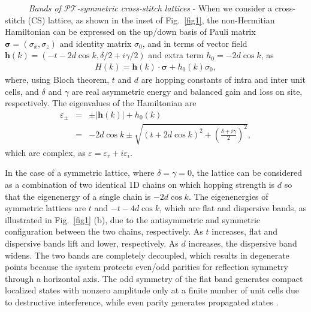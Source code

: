\documentclass[report,epsfig,pre]{revtex4}
\begin{document}
~~~~~ {\it Bands of $\mathcal{PT}$-symmetric cross-stitch lattices} - 
When we consider a cross-stitch (CS) lattice, as shown in the inset of Fig.~\ref{fig1}, the non-Hermitian Hamiltonian can be expressed on the up/down basis of Pauli matrix $\pmb{\sigma}=(\sigma_x,\sigma_z)$ and identity matrix $\sigma_0$, and in terms of vector field $\pmb{h}(k)=(-t-2d\cos{k},\delta/2+i\gamma/2)$ and extra term $h_0=-2d\cos{k}$, as
\begin{eqnarray}
H(k)=\pmb{h}(k)\cdot\pmb{\sigma}+h_0(k)\sigma_0,
\end{eqnarray}
where, using Bloch theorem, $t$ and $d$ are hopping constants of intra and inter unit cells, and $\delta$ and $\gamma$ are real asymmetric energy and balanced gain and loss on site, respectively. The eigenvalues of the Hamiltonian are
\begin{eqnarray}
\nonumber
\varepsilon_{\pm} & = & \pm|\pmb{h}(k)|+h_0(k) \\
& = & -2d \cos{k} \pm \sqrt{(t+2d \cos{k})^2 + \left(\frac{\delta+ i \gamma}{2}\right)^2},
\label{energy}
\end{eqnarray}
which are complex, as $\varepsilon = \varepsilon_r + i \varepsilon_i$.




In the case of a symmetric lattice, where $\delta=\gamma=0$, the lattice can be considered as a combination of two identical 1D chains on which hopping strength is $d$ so that the eigenenergy of a single chain is $-2d \cos{k}$. 
The eigenenergies of symmetric lattices are $t$ and $-t - 4d \cos{k}$, which are flat and dispersive bands, as illustrated in Fig.~\ref{fig1} (b), due to the antisymmetric and symmetric configuration between the two chains, respectively. 
As $t$ increases, flat and dispersive bands lift and lower, respectively. As $d$ increases, the dispersive band widens.
The two bands are completely decoupled, which results in degenerate points because the system protects even/odd parities for reflection symmetry through a horizontal axis. The odd symmetry of the flat band generates compact localized states with nonzero amplitude only at a finite number of unit cells due to destructive interference, while even parity generates propagated states \cite{Fla14, Ge15, Mai16}.
\end{document}
